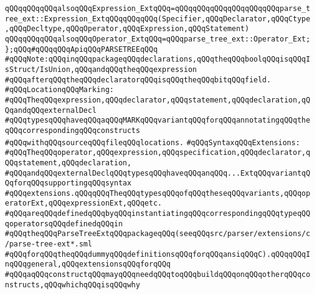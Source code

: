 \verb|qQQqqQQqqQQqalsoqQQqExpression_ExtqQQq=qQQqqQQqqQQqqQQqqQQqqQQqparse_tree_ext::Expression_ExtqQQqqQQqqQQq(Specifier,qQQqDeclarator,qQQqCtype,qQQqDecltype,qQQqOperator,qQQqExpression,qQQqStatement)|\newline
\newline
\verb|qQQqqQQqqQQqalsoqQQqOperator_ExtqQQq=qQQqparse_tree_ext::Operator_Ext;|\newline
\newline
\verb|};qQQq#qQQqqQQqApiqQQqPARSETREEqQQq|\newline
\newline
\verb|#qQQqNote:qQQqinqQQqpackageqQQqdeclarations,qQQqtheqQQqboolqQQqisqQQqIsStruct/IsUnion,qQQqandqQQqtheqQQqexpression|\newline
\verb|#qQQqafterqQQqtheqQQqdeclaratorqQQqisqQQqtheqQQqbitqQQqfield.|\newline
\newline
\newline
\verb|#qQQqLocationqQQqMarking:|\newline
\verb|#qQQqTheqQQqexpression,qQQqdeclarator,qQQqstatement,qQQqdeclaration,qQQqandqQQqexternalDecl|\newline
\verb|#qQQqtypesqQQqhaveqQQqaqQQqMARKqQQqvariantqQQqforqQQqannotatingqQQqtheqQQqcorrespondingqQQqconstructs|\newline
\verb|#qQQqwithqQQqsourceqQQqfileqQQqlocations.|\newline
\newline
\newline
\verb|#qQQqSyntaxqQQqExtensions:|\newline
\verb|#qQQqTheqQQqoperator,qQQqexpression,qQQqspecification,qQQqdeclarator,qQQqstatement,qQQqdeclaration,|\newline
\verb|#qQQqandqQQqexternalDeclqQQqtypesqQQqhaveqQQqanqQQq...ExtqQQqvariantqQQqforqQQqsupportingqQQqsyntax|\newline
\verb|#qQQqextensions.qQQqqQQqTheqQQqtypesqQQqofqQQqtheseqQQqvariants,qQQqoperatorExt,qQQqexpressionExt,qQQqetc.|\newline
\verb|#qQQqareqQQqdefinedqQQqbyqQQqinstantiatingqQQqcorrespondingqQQqtypeqQQqoperatorsqQQqdefinedqQQqin|\newline
\verb|#qQQqtheqQQqParseTreeExtqQQqpackageqQQq(seeqQQqsrc/parser/extensions/c/parse-tree-ext*.sml|\newline
\verb|#qQQqforqQQqtheqQQqdummyqQQqdefinitionsqQQqforqQQqansiqQQqC).qQQqqQQqInqQQqgeneral,qQQqextensionsqQQqforqQQq|\newline
\verb|#qQQqaqQQqconstructqQQqmayqQQqneedqQQqtoqQQqbuildqQQqonqQQqotherqQQqconstructs,qQQqwhichqQQqisqQQqwhy|\newline
